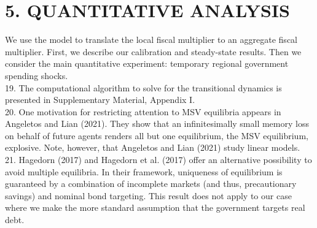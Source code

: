 \documentclass[10pt]{article}
\begin{document}
\section*{5. QUANTITATIVE ANALYSIS}
We use the model to translate the local fiscal multiplier to an aggregate fiscal multiplier. First, we describe our calibration and steady-state results. Then we consider the main quantitative experiment: temporary regional government spending shocks.\\
19. The computational algorithm to solve for the transitional dynamics is presented in Supplementary Material, Appendix I.\\
20. One motivation for restricting attention to MSV equilibria appears in Angeletos and Lian (2021). They show that an infinitesimally small memory loss on behalf of future agents renders all but one equilibrium, the MSV equilibrium, explosive. Note, however, that Angeletos and Lian (2021) study linear models.\\
21. Hagedorn (2017) and Hagedorn et al. (2017) offer an alternative possibility to avoid multiple equilibria. In their framework, uniqueness of equilibrium is guaranteed by a combination of incomplete markets (and thus, precautionary savings) and nominal bond targeting. This result does not apply to our case where we make the more standard assumption that the government targets real debt.
\end{document}
